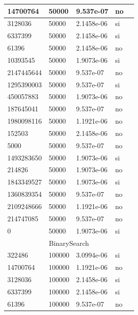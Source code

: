 \documentclass[12pt, fleqn]{article}                             %
\theoremstyle{break}                                            %
\begin{document}
\begin{longtable}{|m{5em}|m{5em}|m{10em}|m{5em}|@{}m{0pt}@{}}
            14700764& 50000  & 9.537e-07 & no &\\[1em]    \hline
            3128036& 50000  & 2.1458e-06 & si &\\[1em]    \hline
            6337399& 50000  & 2.1458e-06 & si &\\[1em]    \hline
            61396& 50000  & 2.1458e-06 & no &\\[1em]    \hline
            10393545& 50000  & 1.9073e-06 & si &\\[1em]    \hline
            2147445644& 50000  & 9.537e-07 & no &\\[1em]    \hline
            1295390003& 50000  & 9.537e-07 & si &\\[1em]    \hline
            450057883& 50000  & 1.9073e-06 & no &\\[1em]    \hline
            187645041& 50000  & 9.537e-07 & no &\\[1em]    \hline
            1980098116& 50000  & 1.1921e-06 & no &\\[1em]    \hline
            152503& 50000  & 2.1458e-06 & no &\\[1em]    \hline
            5000& 50000  & 9.537e-07 & no &\\[1em]    \hline
            1493283650& 50000  & 1.9073e-06 & si &\\[1em]    \hline
            214826& 50000  & 1.9073e-06 & no &\\[1em]    \hline
            1843349527& 50000  & 1.9073e-06 & si &\\[1em]    \hline
            1360839354& 50000  & 9.537e-07 & no &\\[1em]    \hline
            2109248666& 50000  & 1.1921e-06 & no &\\[1em]    \hline
            214747085& 50000  & 9.537e-07 & no &\\[1em]    \hline
            0& 50000  & 1.9073e-06 & si &\\[1em]    \hline
            \multicolumn{5}{|c|}{BinarySearch}   \\          \hline
            322486& 100000  & 3.0994e-06 & si &\\[1em]    \hline
            14700764& 100000  & 1.1921e-06 & no &\\[1em]    \hline
            3128036& 100000  & 2.1458e-06 & si &\\[1em]    \hline
            6337399& 100000  & 2.1458e-06 & si &\\[1em]    \hline
            61396& 100000  & 9.537e-07 & no &\\[1em]    \hline

\end{longtable}
\end{document}

